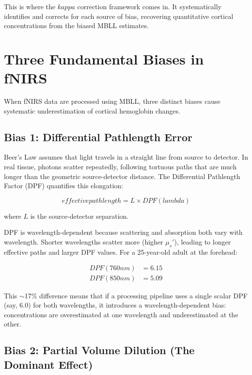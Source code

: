 \documentclass[12pt]{article}
\def\kappa{kappa}%
\def\lambda{lambda}%
\def\text#1{#1}%
\begin{document}
This is where the $\kappa$ correction framework comes in. It systematically identifies and corrects for each source of bias, recovering quantitative cortical concentrations from the biased MBLL estimates.

\section{Three Fundamental Biases in fNIRS}

When fNIRS data are processed using MBLL, three distinct biases cause systematic underestimation of cortical hemoglobin changes.

\subsection{Bias 1: Differential Pathlength Error}

Beer's Law assumes that light travels in a straight line from source to detector. In real tissue, photons scatter repeatedly, following tortuous paths that are much longer than the geometric source-detector distance. The Differential Pathlength Factor (DPF) quantifies this elongation:

\begin{equation}
\text{effective path length} = L \times \text{DPF}(\lambda)
\end{equation}

where $L$ is the source-detector separation.

DPF is wavelength-dependent because scattering and absorption both vary with wavelength. Shorter wavelengths scatter more (higher $\mu_s'$), leading to longer effective paths and larger DPF values. For a 25-year-old adult at the forehead:

\begin{align}
\text{DPF}(760\text{ nm}) &= 6.15 \\
\text{DPF}(850\text{ nm}) &= 5.09
\end{align}

This $\sim$17\% difference means that if a processing pipeline uses a single scalar DPF (say, 6.0) for both wavelengths, it introduces a wavelength-dependent bias: concentrations are overestimated at one wavelength and underestimated at the other.

\subsection{Bias 2: Partial Volume Dilution (The Dominant Effect)}
\end{document}
